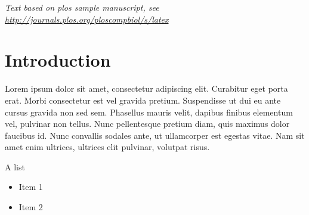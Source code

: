 \documentclass[10pt,letterpaper]{article}
\newenvironment{Shaded}{\begin{snugshade}}{\end{snugshade}}
\newcommand{\KeywordTok}[1]{\textcolor[rgb]{0.13,0.29,0.53}{\textbf{#1}}}
\newcommand{\StringTok}[1]{\textcolor[rgb]{0.31,0.60,0.02}{#1}}
\newcommand{\OperatorTok}[1]{\textcolor[rgb]{0.81,0.36,0.00}{\textbf{#1}}}
\newcommand{\NormalTok}[1]{#1}
\providecommand{\tightlist}{%
  \setlength{\itemsep}{0pt}\setlength{\parskip}{0pt}}
\begin{document}
\linenumbers

\emph{Text based on plos sample manuscript, see
\url{http://journals.plos.org/ploscompbiol/s/latex}}

\section{Introduction}\label{introduction}

Lorem ipsum dolor sit amet, consectetur adipiscing elit. Curabitur eget
porta erat. Morbi consectetur est vel gravida pretium. Suspendisse ut
dui eu ante cursus gravida non sed sem. Phasellus mauris velit, dapibus
finibus elementum vel, pulvinar non tellus. Nunc pellentesque pretium
diam, quis maximus dolor faucibus id. Nunc convallis sodales ante, ut
ullamcorper est egestas vitae. Nam sit amet enim ultrices, ultrices elit
pulvinar, volutpat risus.

A list

\begin{itemize}
\tightlist
\item
  Item 1
\item
  Item 2
\end{itemize}

\begin{Shaded}
\end{Shaded}
\end{document}
